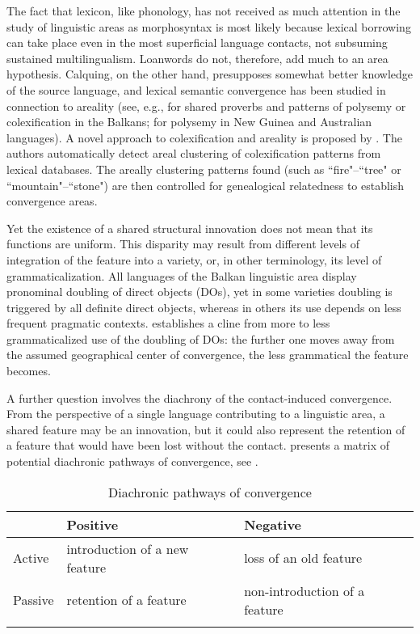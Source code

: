 \documentclass[output=paper]{langscibook}
\begin{document}
The fact that lexicon, like phonology, has not received as much attention in the study of linguistic areas as morphosyntax is most likely because lexical borrowing can take place even in the most superficial language contacts, not subsuming sustained multilingualism. Loanwords do not, therefore, add much to an area hypothesis. Calquing, on the other hand, presupposes somewhat better knowledge of the source language, and lexical semantic convergence has been studied in connection to areality (see, e.g., \citealt[48–61]{asenova2002} for shared proverbs and patterns of polysemy or colexification in the Balkans; \citealt{aikhenvald2009} for polysemy in New Guinea and Australian languages). A novel approach to colexification and areality is proposed by \textcite{gast2018}. The authors automatically detect areal clustering of colexification patterns from lexical databases. The  areally clustering patterns found (such as ``fire"--``tree" or ``mountain"--``stone") are then controlled for genealogical relatedness to establish convergence areas. 

Yet the existence of a shared structural innovation does not mean that its functions are uniform. This disparity may result from different levels of integration of the feature into a variety, or, in other terminology, its level of grammaticalization. All languages of the Balkan linguistic area display pronominal doubling of direct objects (DOs), yet in some varieties doubling is triggered by all definite direct objects, whereas in others its use depends on less frequent pragmatic contexts. \citet{friedman2008} establishes a cline from more to less grammaticalized use of the doubling of DOs: the further one moves away from the assumed geographical center of convergence, the less grammatical the feature becomes.

A further question involves the diachrony of the contact-induced convergence. From the perspective of a single language contributing to a linguistic area, a shared feature may be an innovation, but it could also represent the retention of a feature that would have been lost without the contact. \citet[117]{janhunen2005} presents a matrix of potential diachronic pathways of convergence, see .

\begin{table}
\caption{Diachronic pathways of convergence \parencite[117]{janhunen2005}\label{diachronic paths}}
 \begin{tabular}{ l l l } 
  \lsptoprule
         & Positive & Negative \\\midrule
  Active  &   introduction of a new feature & loss of an old feature \\
  Passive  &  retention of a feature & non-introduction of a feature \\
  \lspbottomrule
 \end{tabular}
\end{table}
\end{document}
